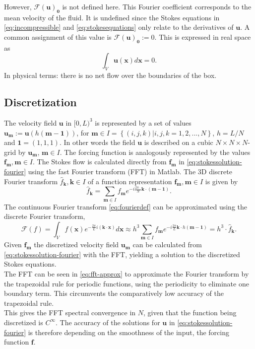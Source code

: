 \documentclass[a4paper,
twoside=false,abstract=false,numbers=noenddot,
titlepage=false,headings=small,parskip=half,version=last]{scrartcl}
\begin{document}
However, $\mathcal{F}(\mathbf{u})_\mathbf{0}$ is not defined here.
This Fourier coefficient corresponds to the mean velocity of the fluid.
It is undefined since the Stokes equations in \eqref{eq:incompressible} and \eqref{eq:stokesequations} only relate to the derivatives of $\mathbf{u}$.
A common assignment of this value is $\mathcal{F}(\mathbf{u})_\mathbf{0}:=0$.
This is expressed in real space as
\begin{equation}
\int_V \mathbf{u}(\mathbf{x})d\mathbf{x} = 0.\label{eq:nonetflow}
\end{equation}
In physical terms: there is no net flow over the boundaries of the box.

\subsection{Discretization}
The velocity field $\mathbf{u}$ in $[0,L)^3$ is represented by a set of values $\mathbf{u}_\mathbf{m}:=\mathbf{u}(h(\mathbf{m}-\mathbf{1}))$, for $\mathbf{m}\in I = \left\{(i,j,k) | i,j,k=1,2,...,N\right\}$, $h=L/N$ and $\mathbf{1}=(1,1,1)$.
In other words the field $\mathbf{u}$ is described on a cubic $N\times N\times N$-grid by $\mathbf{u}_\mathbf{m}$, $\mathbf{m}\in I$.
The forcing function is analogously represented by the values $\mathbf{f}_\mathbf{m}, \mathbf{m}\in I$.
The Stokes flow is calculated directly from $\mathbf{f}_\mathbf{m}$ in \eqref{eq:stokessolution-fourier} using the fast Fourier transform (FFT) in Matlab.
The 3D discrete Fourier transform $\hat{f}_\mathbf{k}, \mathbf{k}\in I$ of a function representation $\mathbf{f}_\mathbf{m}, \mathbf{m}\in I$ is given by
\begin{equation}
\hat{f}_\mathbf{k} = \sum_{\mathbf{m}\in I} f_\mathbf{m} e^{-i\frac{2\pi \cdot }{N} \mathbf{k}\cdot (\mathbf{m}-\mathbf{1})}.\nonumber
\end{equation}
The continuous Fourier transform \eqref{eq:fourierdef} can be approximated using the discrete Fourier transform,
\begin{equation}
\mathcal{F}(f) = \int_V f(\mathbf{x}) e^{-\frac{2\pi}{L}i(\mathbf{k}\cdot \mathbf{x})}d\mathbf{x}
\approx h^3 \sum_{\mathbf{m}\in I} f_\mathbf{m} e^{-i\frac{2\pi}{L}\mathbf{k}\cdot h(\mathbf{m}-\mathbf{1})}
= h^3 \cdot \hat{f}_\mathbf{k}.\label{eq:fft-approx}
\end{equation}
Given $\mathbf{f}_\mathbf{m}$ the discretized velocity field $\mathbf{u}_\mathbf{m}$ can be calculated from \eqref{eq:stokessolution-fourier} with the FFT, yielding a solution to the discretized Stokes equations.\\
The FFT can be seen in \eqref{eq:fft-approx} to approximate the Fourier transform by the trapezoidal rule for periodic functions, using the periodicity to eliminate one boundary term.
This circumvents the comparatively low accuracy of the trapezoidal rule.\\
This gives the FFT spectral convergence in $N$, given that the function being discretized is $C^\infty$. The accuracy of the solutions for $\mathbf{u}$ in \eqref{eq:stokessolution-fourier} is therefore depending on the smoothness of the input, the forcing function $\mathbf{f}$.
\end{document}
